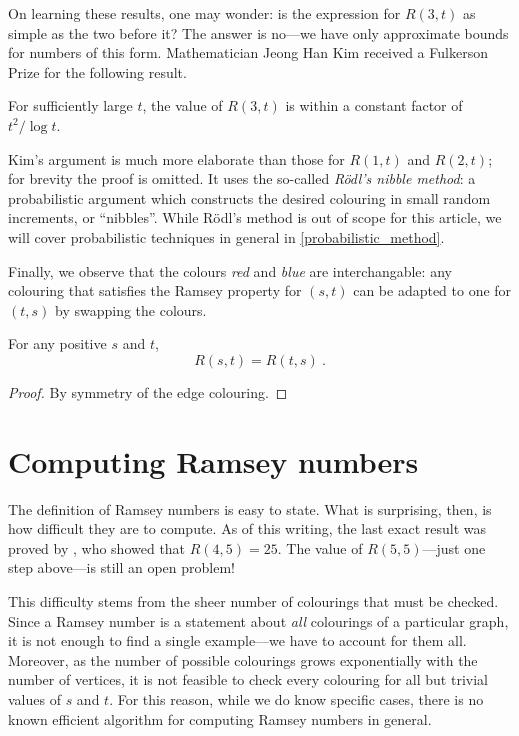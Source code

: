 \documentclass{article}
\begin{document}
On learning these results, one may wonder: is the expression for $R(3,t)$ as simple as the two before it? The answer is no---we have only approximate bounds for numbers of this form. Mathematician Jeong Han Kim received a Fulkerson Prize for the following result.

\begin{Theorem} \label{kims_theorem}
    For sufficiently large $t$, the value of $R(3,t)$ is within a constant factor of $t^2/\log t$.
\end{Theorem}

Kim's argument is much more elaborate than those for $R(1,t)$ and $R(2,t)$; for brevity the proof is omitted. It uses the so-called \textit{R\"{o}dl's nibble method}: a probabilistic argument which constructs the desired colouring in small random increments, or ``nibbles''. While R\"{o}dl's method is out of scope for this article, we will cover probabilistic techniques in general in \cref{probabilistic_method}.

Finally, we observe that the colours \emph{red} and \emph{blue} are interchangable: any colouring that satisfies the Ramsey property for $(s,t)$ can be adapted to one for $(t,s)$ by swapping the colours.

\begin{Proposition}
    For any positive $s$ and $t$,
    \[ R(s,t) = R(t,s) \ . \]
\end{Proposition}

\begin{proof}
    By symmetry of the edge colouring.
\end{proof}

\section{Computing Ramsey numbers}

The definition of Ramsey numbers is easy to state. What is surprising, then, is how difficult they are to compute. As of this writing, the last exact result was proved by \cite{JGT:JGT3190190304}, who showed that $R(4,5) = 25$. The value of $R(5,5)$---just one step above---is still an open problem!


This difficulty stems from the sheer number of colourings that must be checked. Since a Ramsey number is a statement about \emph{all} colourings of a particular graph, it is not enough to find a single example---we have to account for them all. Moreover, as the number of possible colourings grows exponentially with the number of vertices, it is not feasible to check every colouring for all but trivial values of $s$ and $t$. For this reason, while we do know specific cases, there is no known efficient algorithm for computing Ramsey numbers in general.
\end{document}
